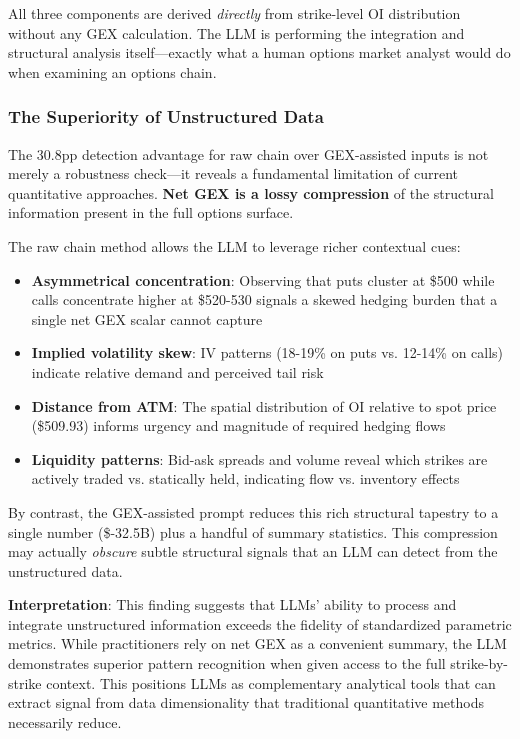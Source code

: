 All three components are derived \textit{directly} from strike-level OI distribution without any GEX calculation. The LLM is performing the integration and structural analysis itself—exactly what a human options market analyst would do when examining an options chain.

\subsubsection{The Superiority of Unstructured Data}

The 30.8pp detection advantage for raw chain over GEX-assisted inputs is not merely a robustness check—it reveals a fundamental limitation of current quantitative approaches. \textbf{Net GEX is a lossy compression} of the structural information present in the full options surface.

The raw chain method allows the LLM to leverage richer contextual cues:

\begin{itemize}
    \item \textbf{Asymmetrical concentration}: Observing that puts cluster at \$500 while calls concentrate higher at \$520-530 signals a skewed hedging burden that a single net GEX scalar cannot capture
    \item \textbf{Implied volatility skew}: IV patterns (18-19\% on puts vs. 12-14\% on calls) indicate relative demand and perceived tail risk
    \item \textbf{Distance from ATM}: The spatial distribution of OI relative to spot price (\$509.93) informs urgency and magnitude of required hedging flows
    \item \textbf{Liquidity patterns}: Bid-ask spreads and volume reveal which strikes are actively traded vs. statically held, indicating flow vs. inventory effects
\end{itemize}

By contrast, the GEX-assisted prompt reduces this rich structural tapestry to a single number (\$-32.5B) plus a handful of summary statistics. This compression may actually \textit{obscure} subtle structural signals that an LLM can detect from the unstructured data.

\textbf{Interpretation}: This finding suggests that LLMs' ability to process and integrate unstructured information exceeds the fidelity of standardized parametric metrics. While practitioners rely on net GEX as a convenient summary, the LLM demonstrates superior pattern recognition when given access to the full strike-by-strike context. This positions LLMs as complementary analytical tools that can extract signal from data dimensionality that traditional quantitative methods necessarily reduce.

